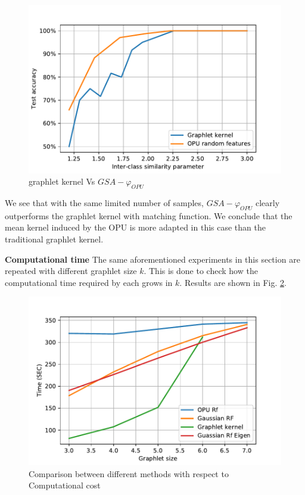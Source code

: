 \begin{figure}[H]
\centering
\includegraphics[scale=0.6]{figs/gk_vs_opu.pdf}
\caption[graphlet kernel Vs $GSA-\varphi_{OPU}$  ]{graphlet kernel Vs $GSA-\varphi_{OPU}$   }
\label{fig:gk_vs_opu}
\end{figure}
We see that with the same limited number of samples, $GSA-\varphi_{OPU}$ clearly outperforms the graphlet kernel with matching function. We conclude that the mean kernel induced by the OPU is more adapted in this case than the traditional graphlet kernel. %

\textbf{Computational time}
The same aforementioned experiments in this section are repeated with different graphlet size $k$. This is done to check how the computational time required by each grows in $k$. Results are shown in Fig. \ref{fig:computational_comparison}.
\begin{figure}[H]
\centering
\includegraphics[scale=0.6]{figs/computational_comp.pdf}
\caption[Comparison in Computational cost between methods  ]{Comparison between different methods with respect to Computational cost  }
\label{fig:computational_comparison}
\end{figure}

